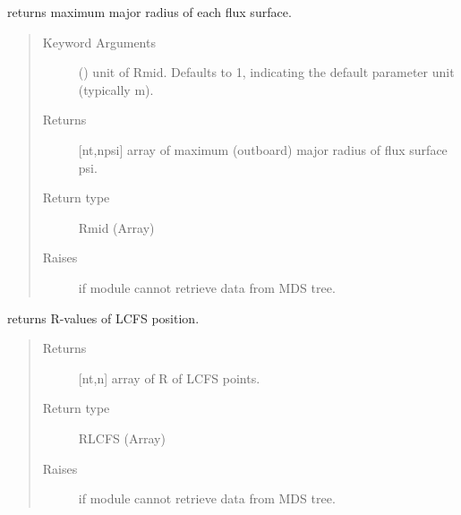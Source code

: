 \documentclass[letterpaper,10pt,english]{sphinxmanual}
\begin{document}
\begin{fulllineitems}
\begin{fulllineitems}
\label{\detokenize{eqtools:eqtools.EFIT.EFITTree.getRmidPsi}}
returns maximum major radius of each flux surface.
\begin{quote}\begin{description}
\item[{Keyword Arguments}] \leavevmode
{} () \textendash{} unit of Rmid.  Defaults to 1, indicating
the default parameter unit (typically m).

\item[{Returns}] \leavevmode
{[}nt,npsi{]} array of maximum (outboard) major radius of
flux surface psi.

\item[{Return type}] \leavevmode
Rmid (Array)

\item[{Raises}] \leavevmode
{} \textendash{} if module cannot retrieve data from MDS tree.

\end{description}\end{quote}

\end{fulllineitems}


\begin{fulllineitems}
\label{\detokenize{eqtools:eqtools.EFIT.EFITTree.getRLCFS}}
returns R-values of LCFS position.
\begin{quote}\begin{description}
\item[{Returns}] \leavevmode
{[}nt,n{]} array of R of LCFS points.

\item[{Return type}] \leavevmode
RLCFS (Array)

\item[{Raises}] \leavevmode
{} \textendash{} if module cannot retrieve data from MDS tree.


\end{description}
\end{quote}
\end{fulllineitems}
\end{fulllineitems}
\end{document}

